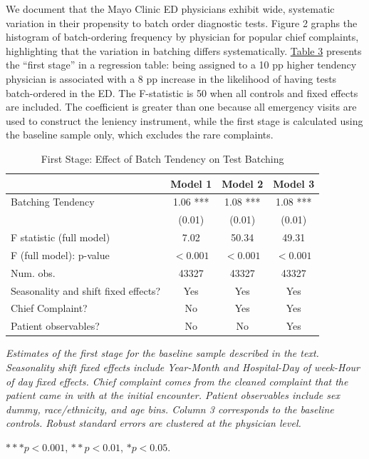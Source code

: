 \documentclass[,,nonblindrev]{informs}
\begin{document}
We document that the Mayo Clinic ED physicians exhibit wide, systematic
variation in their propensity to batch order diagnostic tests. Figure 2
graphs the histogram of batch-ordering frequency by physician for
popular chief complaints, highlighting that the variation in batching
differs systematically. \hyperref[tab:regression]{Table 3} presents the
``first stage'' in a regression table: being assigned to a 10 pp higher
tendency physician is associated with a 8 pp increase in the likelihood
of having tests batch-ordered in the ED. The F-statistic is 50 when all
controls and fixed effects are included. The coefficient is greater than
one because all emergency visits are used to construct the leniency
instrument, while the first stage is calculated using the baseline
sample only, which excludes the rare complaints.

\begin{table}[ht]
\centering
\caption{First Stage: Effect of Batch Tendency on Test Batching}
\label{tab:regression}
\begin{tabular}{p{9cm}ccc}
\toprule
\textbf{} & \textbf{Model 1} & \textbf{Model 2} & \textbf{Model 3} \\
\midrule
Batching Tendency & 1.06 *** & 1.08 *** & 1.08 *** \\
 & (0.01) & (0.01) & (0.01) \\
\midrule
F statistic (full model) & 7.02 & 50.34 & 49.31  \\  
F (full model): p-value & $<0.001$ & $<0.001$ & $<0.001$ \\
\midrule
Num. obs. & 43327 & 43327 & 43327 \\
Seasonality and shift fixed effects? & Yes & Yes & Yes \\
Chief Complaint? & No & Yes & Yes \\
Patient observables? & No & No & Yes \\
\bottomrule
\end{tabular}
\begin{tablenotes}
\small
\item \textit{Estimates of the first stage for the baseline sample described in the text. Seasonality shift fixed effects include Year-Month and Hospital-Day of week-Hour of day fixed effects. Chief complaint comes from the cleaned complaint that the patient came in with at the initial encounter. Patient observables include sex dummy, race/ethnicity, and age bins. Column 3 corresponds to the baseline controls. Robust standard errors are clustered at the physician level.}
\item $*** p < 0.001$, $** p < 0.01$, $* p < 0.05$.
\end{tablenotes}
\end{table}
\end{document}
